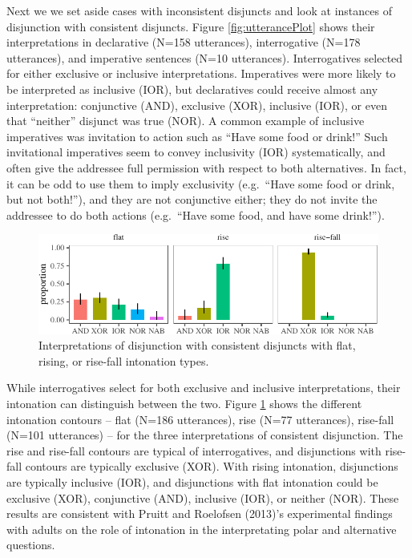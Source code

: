 \documentclass[
  english,
  ,man,floatsintext]{apa6}
\begin{document}
Next we we set aside cases with inconsistent disjuncts and look at instances of disjunction with consistent disjuncts. Figure \ref{fig:utterancePlot} shows their interpretations in declarative (N=158 utterances), interrogative (N=178 utterances), and imperative sentences (N=10 utterances). Interrogatives selected for either exclusive or inclusive interpretations. Imperatives were more likely to be interpreted as inclusive (IOR), but declaratives could receive almost any interpretation: conjunctive (AND), exclusive (XOR), inclusive (IOR), or even that ``neither'' disjunct was true (NOR). A common example of inclusive imperatives was invitation to action such as ``Have some food or drink!'' Such invitational imperatives seem to convey inclusivity (IOR) systematically, and often give the addressee full permission with respect to both alternatives. In fact, it can be odd to use them to imply exclusivity (e.g.~``Have some food or drink, but not both!''), and they are not conjunctive either; they do not invite the addressee to do both actions (e.g.~``Have some food, and have some drink!'').

\begin{figure}[H]

{\centering \includegraphics{figs/intonationPlot-1} 

}

\caption{Interpretations of disjunction with consistent disjuncts with flat, rising, or rise-fall intonation types.}\label{fig:intonationPlot}
\end{figure}

While interrogatives select for both exclusive and inclusive interpretations, their intonation can distinguish between the two. Figure \ref{fig:intonationPlot} shows the different intonation contours -- flat (N=186 utterances), rise (N=77 utterances), rise-fall (N=101 utterances) -- for the three interpretations of consistent disjunction. The rise and rise-fall contours are typical of interrogatives, and disjunctions with rise-fall contours are typically exclusive (XOR). With rising intonation, disjunctions are typically inclusive (IOR), and disjunctions with flat intonation could be exclusive (XOR), conjunctive (AND), inclusive (IOR), or neither (NOR). These results are consistent with Pruitt and Roelofsen (2013)'s experimental findings with adults on the role of intonation in the interpretating polar and alternative questions.
\end{document}
